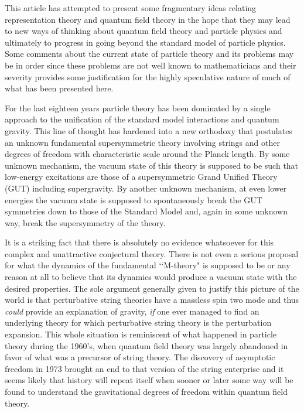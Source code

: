 \documentclass[a4paper,a4paper]{article}
\theoremstyle{conjecture}
\begin{document}
This article has attempted to present some fragmentary ideas relating representation theory and
quantum field theory in the hope that they may lead to new ways of thinking about quantum field
theory and particle physics and ultimately to progress in going beyond the standard model of particle
physics.  Some comments about the current state of particle theory and its problems
\cite{polemic, Friedan} may be in order
since these problems are not well known to mathematicians and their severity provides some
justification for the highly speculative nature of much of what has been presented here.

For the last eighteen years particle theory has been dominated by a single approach
to the unification of the standard model interactions and quantum gravity.  This line of thought has
hardened into a new orthodoxy that postulates an unknown fundamental supersymmetric theory involving
strings and other degrees of freedom with characteristic scale around the Planck length. By some
unknown mechanism, the vacuum state of this theory is supposed to be such that low-energy excitations
are those of a supersymmetric Grand Unified Theory (GUT) including supergravity. By another unknown
mechanism, at even lower energies the vacuum state is supposed to spontaneously break the GUT
symmetries down to those of the Standard Model and, again in some unknown way, break the
supersymmetry of the theory.

It is a striking fact that there is absolutely no evidence
whatsoever for this complex and unattractive conjectural theory.
There is not even a serious proposal for what the dynamics of the
fundamental \lq\lq M-theory" is supposed to be or any reason at
all to believe that its dynamics would produce a vacuum state with
the desired properties.  The sole argument generally given to
justify this picture of the world is that perturbative string
theories have a massless spin two mode and thus {\it{could}}
provide an explanation of gravity, {\it{if}} one ever managed to
find an underlying theory for which perturbative string theory is
the perturbation expansion.  This whole situation is  reminiscent
of what happened in particle theory during the 1960's, when
quantum field theory was largely abandoned in favor of what was a
precursor of string theory.  The discovery of asymptotic freedom
in 1973 brought an end to that version of the string enterprise
and it seems likely that history will repeat itself when sooner or
later some way will be found to understand the gravitational
degrees of freedom within quantum field theory.
\end{document}
